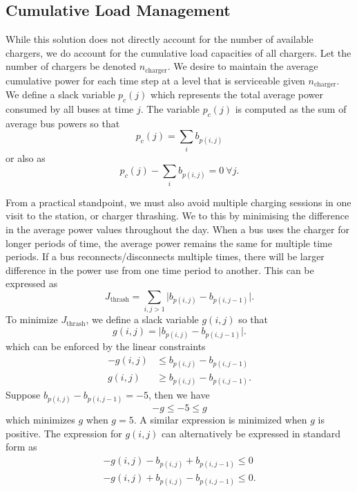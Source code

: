 \subsection{Cumulative Load Management}
\par While this solution does not directly account for the number of available chargers, we do account for the cumulative load capacities of all chargers.  Let the number of chargers be denoted $n_{\text{charger}}$. We desire to maintain the average cumulative power for each time step at a level that is serviceable given $n_{\text{charger}}$. We define a slack variable $p_c(j)$ which represents the total average power consumed by all buses at time $j$.  The variable $p_c(j)$ is computed as the sum of average bus powers so that
\begin{equation*}
	p_c(j) = \sum_ib_{p(i,j)}
\end{equation*}
or also as 
\begin{equation}
p_c(j) - \sum_ib_{p(i,j)}  = 0\ \forall j.
\end{equation}
\par From a practical standpoint, we must also avoid multiple charging sessions in one visit to the station, or charger thrashing. We to this by minimising the difference in the average power values throughout the day.  When a bus uses the charger for longer periods of time, the average power remains the same for multiple time periods.  If a bus reconnects/disconnects multiple times, there will be larger difference in the power use from one time period to another. This can be expressed as
\begin{equation}
	J_{\text{thrash}} = \sum_{i,j > 1} \lvert b_{p(i,j)} - b_{p(i,j-1)}\rvert.
\end{equation}
To minimize $J_{\text{thrash}}$, we define a slack variable $g(i,j)$ so that 
\begin{equation*}
g(i,j) = \lvert b_{p(i,j)} - b_{p(i,j-1)} \rvert.
\end{equation*}
which can be enforced by the linear constraints 
\begin{equation*}\begin{aligned}
	-g(i,j) &\le b_{p(i,j)} - b_{p(i,j-1)} \\
	g(i,j) &\ge b_{p(i,j)} - b_{p(i,j-1)}.
\end{aligned}\end{equation*}
Suppose $b_{p(i,j)} - b_{p(i,j-1)} = -5$, then we have 
\begin{equation*}
	-g \le -5 \le g
\end{equation*}
which minimizes $g$ when $g = 5$. A similar expression is minimized when $g$ is positive. The expression for $g(i,j)$ can alternatively be expressed in standard form as
\begin{equation}\begin{aligned}
-g(i,j) - b_{p(i,j)} + b_{p(i,j-1)} \le 0 \\
-g(i,j) + b_{p(i,j)} - b_{p(i,j-1)} \le 0.
\end{aligned}\end{equation}


